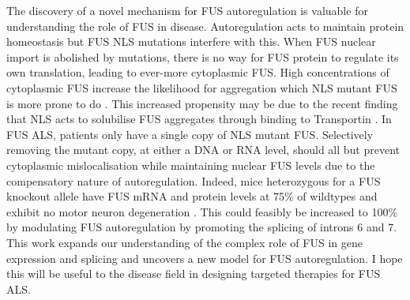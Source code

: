 The discovery of a novel mechanism for FUS autoregulation is valuable for understanding the role of FUS in disease.
Autoregulation acts to maintain protein homeostasis but FUS NLS mutations interfere with this.
When FUS nuclear import is abolished by mutations, there is no way for FUS protein to regulate  its own translation, leading to ever-more cytoplasmic FUS.
High concentrations of cytoplasmic FUS increase the likelihood for aggregation which NLS mutant FUS is more prone to do \citep{Bosco2010}. 
This increased propensity may be due to the recent finding that NLS acts to solubilise FUS aggregates through binding to Transportin \citep{Guo2018,Yoshizawa2018,Hofweber2018}.
In FUS ALS, patients only have a single copy of NLS mutant FUS. 
Selectively removing the mutant copy, at either a DNA or RNA level, should all but prevent cytoplasmic mislocalisation while maintaining nuclear FUS levels due to the compensatory nature of autoregulation. 
Indeed, mice heterozygous for a FUS knockout allele have FUS mRNA and protein levels at 75\% of wildtypes and exhibit no motor neuron degeneration \citep{Scekic-Zahirovic2017}. 
This could feasibly be increased to 100\% by modulating FUS autoregulation by promoting the splicing of introns 6 and 7. 
This work expands our understanding of the complex role of FUS in gene expression and splicing and uncovers a new model for FUS autoregulation. 
I hope this will be useful to the disease field in designing targeted therapies for FUS ALS.









